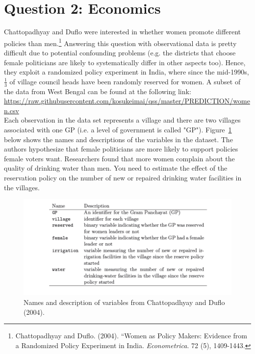 \documentclass[12pt,letterpaper]{article}
\begin{document}
 \section*{Question 2: Economics}
 Chattopadhyay and Duflo were interested in whether women promote different policies than men.\footnote{Chattopadhyay and Duflo. (2004). ``Women as Policy Makers: Evidence from a Randomized Policy Experiment in India. \textit{Econometrica}. 72 (5), 1409-1443.} Answering this question with observational data is pretty difficult due to potential confounding problems (e.g. the districts that choose female politicians are likely to systematically differ in other aspects too). Hence, they exploit a randomized policy experiment in India, where since the mid-1990s, $\frac{1}{3}$ of village council heads have been randomly reserved for women. A subset of the data from West Bengal can be found at the following link: \url{https://raw.githubusercontent.com/kosukeimai/qss/master/PREDICTION/women.csv}\\
 
 \noindent Each observation in the data set represents a village and there are two villages associated with one GP (i.e. a level of government is called "GP"). Figure~\ref{fig:women_desc} below shows the names and descriptions of the variables in the dataset. The authors hypothesize that female politicians are more likely to support policies female voters want. Researchers found that more women complain about the quality of drinking water than men. You need to estimate the effect of the reservation policy on the number of new or repaired drinking water facilities in the villages.
 \vspace{.5cm}
 
 \begin{figure}[h!]
 	\caption{\footnotesize{Names and description of variables from Chattopadhyay and Duflo (2004).}}
 	\vspace{.5cm}
 	\centering
 	\label{fig:women_desc}
 	\includegraphics[width=1.1\textwidth]{figure1.png}
 \end{figure}		
 
\end{document}
